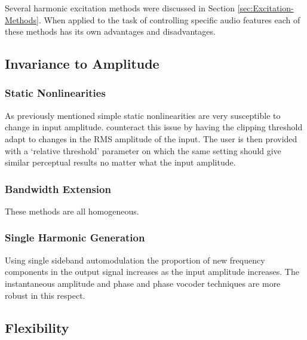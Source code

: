 
	Several harmonic excitation methods were discussed in Section \ref{sec:Excitation-Methods}. When applied to the task of controlling specific audio features each of these methods has its own advantages and disadvantages.

	\subsection{Invariance to Amplitude}
	\label{sec:FeatureControl-AmplitudeInvariance}

		\subsubsection*{Static Nonlinearities}		
			As previously mentioned simple static nonlinearities are very susceptible to change in input amplitude. \citet{deman2014adaptive} counteract this issue by having the clipping threshold adapt to changes in the RMS amplitude of the input. The user is then provided with a `relative threshold' parameter on which the same setting should give similar perceptual results no matter what the input amplitude.


		\subsubsection*{Bandwidth Extension}
			These methods are all homogeneous.
			
		\subsubsection*{Single Harmonic Generation}
			Using single sideband automodulation the proportion of new frequency components in the output signal increases as the input amplitude increases. The instantaneous amplitude and phase and phase vocoder techniques are more robust in this respect.

	\subsection{Flexibility}
	\label{sec:FeatureControl-Flexibility}


